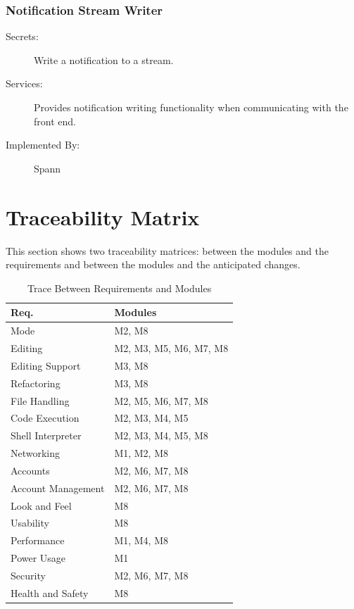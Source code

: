 \documentclass[12pt, titlepage]{article}
\begin{document}
\subsubsection{Notification Stream Writer}

\begin{description}
\item[Secrets:] Write a notification to a stream.
\item[Services:] Provides notification writing functionality when communicating
    with the front end.
\item[Implemented By:] Spann
\end{description}

\section{Traceability Matrix} \label{SecTM}

This section shows two traceability matrices: between the modules and the
requirements and between the modules and the anticipated changes.

\begin{table}[H]
\centering
\begin{tabular}{p{} p{}}
\toprule
\textbf{Req.} & \textbf{Modules}\\
\midrule
    Mode & M2, M8\\
    Editing & M2, M3, M5, M6, M7, M8\\
    Editing Support & M3, M8\\
    Refactoring & M3, M8\\
    File Handling & M2, M5, M6, M7, M8\\
    Code Execution & M2, M3, M4, M5\\
    Shell Interpreter & M2, M3, M4, M5, M8\\
    Networking & M1, M2, M8\\
    Accounts & M2, M6, M7, M8\\
    Account Management & M2, M6, M7, M8\\
    Look and Feel & M8\\
    Usability & M8\\
    Performance & M1, M4, M8\\
    Power Usage & M1\\
    Security & M2, M6, M7, M8\\
    Health and Safety & M8\\
\bottomrule
\end{tabular}
\caption{Trace Between Requirements and Modules}
\label{TblRT}
\end{table}
\end{document}

